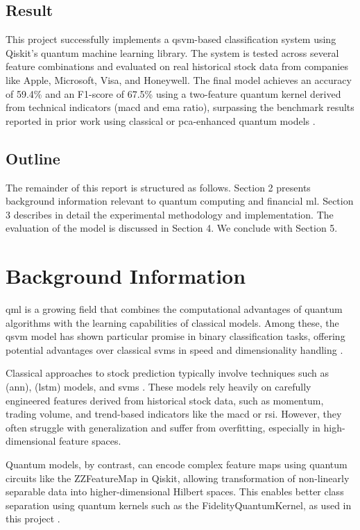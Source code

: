 \documentclass{article}
\begin{document}
\subsection{Result}

This project successfully implements a \gls{qsvm}-based classification system using Qiskit's quantum machine learning library. The system is tested across several feature combinations and evaluated on real historical stock data from companies like Apple, Microsoft, Visa, and Honeywell. The final model achieves an accuracy of 59.4\% and an F1-score of 67.5\% using a two-feature quantum kernel derived from technical indicators (\gls{macd} and \gls{ema} ratio), surpassing the benchmark results reported in prior work using classical or \gls{pca}-enhanced quantum models \cite{srivastava2023}.

\subsection{Outline}

The remainder of this report is structured as follows. Section 2 presents background information relevant to quantum computing and financial \gls{ml}. Section 3 describes in detail the experimental methodology and implementation. The evaluation of the model is discussed in Section 4. We conclude with Section 5.

\section{Background Information}

\gls{qml} is a growing field that combines the computational advantages of quantum algorithms with the learning capabilities of classical models. Among these, the \gls{qsvm} model has shown particular promise in binary classification tasks, offering potential advantages over classical \gls{svm}s in speed and dimensionality handling \cite{bhasin2024}.

Classical approaches to stock prediction typically involve techniques such as (\gls{ann}), (\gls{lstm}) models, and \gls{svm}s \cite{Chhajer22}. These models rely heavily on carefully engineered features derived from historical stock data, such as momentum, trading volume, and trend-based indicators like the \gls{macd} or \gls{rsi}. However, they often struggle with generalization and suffer from overfitting, especially in high-dimensional feature spaces.

Quantum models, by contrast, can encode complex feature maps using quantum circuits like the ZZFeatureMap in Qiskit, allowing transformation of non-linearly separable data into higher-dimensional Hilbert spaces. This enables better class separation using quantum kernels such as the FidelityQuantumKernel, as used in this project \cite{muir2025}.
\end{document}
